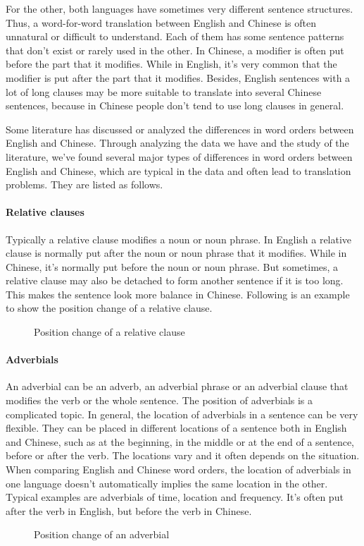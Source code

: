 For the other, both languages have sometimes very different sentence structures. Thus, a word-for-word translation between English and Chinese is often unnatural or difficult to understand. Each of them has some sentence patterns that don't exist or rarely used in the other. In Chinese, a modifier is often put before the part that it modifies. While in English, it's very common that the modifier is put after the part that it modifies. Besides, English sentences with a lot of long clauses may be more suitable to translate into several Chinese sentences, because in Chinese people don't tend to use long clauses in general. 

Some literature \citep{syntactic} has discussed or analyzed the differences in word orders between English and Chinese. Through analyzing the data we have and the study of the literature, we've found several major types of differences in word orders between English and Chinese, which are typical in the data and often lead to translation problems. They are listed as follows.

\paragraph{Relative clauses}
Typically a relative clause modifies a noun or noun phrase. In English a relative clause is normally put after the noun or noun phrase that it modifies. While in Chinese, it's normally put before the noun or noun phrase. But sometimes, a relative clause may also be detached to form another sentence if it is too long. This makes the sentence look more balance in Chinese. Following is an example to show the position change of a relative clause.
\begin{figure}[H]
\centering

\caption{Position change of a relative clause}
\end{figure}

\paragraph{Adverbials}
An adverbial can be an adverb, an adverbial phrase or an adverbial clause that modifies the verb or the whole sentence. The position of adverbials is a complicated topic. In general, the location of adverbials in a sentence can be very flexible. They can be placed in different locations of a sentence both in English and Chinese, such as at the beginning, in the middle or at the end of a sentence, before or after the verb. The locations vary and it often depends on the situation. When comparing English and Chinese word orders, the location of adverbials in one language doesn't automatically implies the same location in the other. Typical examples are adverbials of time, location and frequency. It's often put after the verb in English, but before the verb in Chinese. 
\begin{figure}[H]
\centering

\caption{Position change of an adverbial}
\end{figure}

